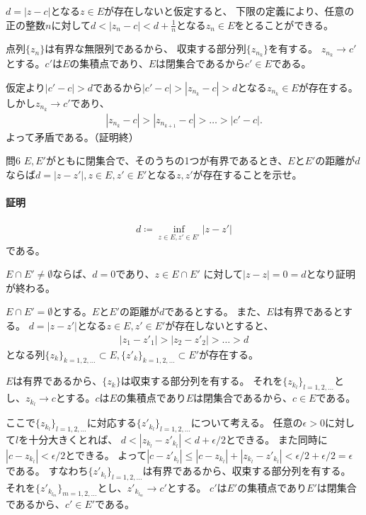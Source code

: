 $d=|z-c|$となる$z\in E$が存在しないと仮定すると、
下限の定義により、任意の正の整数$n$に対して$d<|z_n-c|<d+\frac{1}{n}$となる$z_n\in E$をとることができる。

点列$\{z_n\}$は有界な無限列であるから、
収束する部分列$\{z_{n_k}\}$を有する。
$z_{n_k}\longrightarrow c'$とする。$c'$は$E$の集積点であり、$E$は閉集合であるから$c'\in E$である。

仮定より$|c'-c|>d$であるから$|c'-c|>|z_{n_k}-c|>d$となる$z_{n_k}\in E$が存在する。しかし$z_{n_k}\longrightarrow c'$であり、
\begin{align*}
    |z_{n_k}-c|>|z_{n_{k+1}}-c|>\dots>|c'-c|.
\end{align*}
よって矛盾である。（証明終）

\begin{mysimplebox}{問6}
    $E, E'$がともに閉集合で、そのうちの1つが有界であるとき、$E$と$E'$の距離が$d$ならば$d=|z-z'|, z\in E, z'\in E'$となる$z, z'$が存在することを示せ。
\end{mysimplebox}
\paragraph{証明}
\begin{align*}
    d\coloneqq \inf_{z\in E, z'\in E'}|z-z'|
\end{align*}
である。

$E\cap E'\neq \emptyset$ならば、$d=0$であり、$z\in E\cap E'$
に対して$|z-z|=0=d$となり証明が終わる。

$E\cap E'=\emptyset$とする。$E$と$E'$の距離が$d$であるとする。
また、$E$は有界であるとする。
$d=|z-z'|$となる$z\in E, z'\in E'$が存在しないとすると、
\begin{align*}
    |z_1-z'_1|>|z_2-z'_2|>\dots>d
\end{align*}
となる列$\{z_k\}_{k=1,2,\dots}\subset E, \{z'_k\}_{k=1,2,\dots}\subset E'$が存在する。

$E$は有界であるから、$\{z_k\}$は収束する部分列を有する。
それを$\{z_{k_l}\}_{l=1,2,\dots}$とし、$z_{k_l}\longrightarrow c$とする。$c$は$E$の集積点であり$E$は閉集合であるから、$c\in E$である。

ここで$\{z_{k_l}\}_{l=1,2,\dots}$に対応する$\{z'_{k_l}\}_{l=1,2,\dots}$について考える。
任意の$\epsilon>0$に対して$l$を十分大きくとれば、
$d<|z_{k_l}-z'_{k_l}|<d+\epsilon/2$とできる。
また同時に$|c-z_{k_l}|<\epsilon/2$とできる。
よって$|c-z'_{k_l}|\le|c-z_{k_l}|+|z_{k_l}-z'_{k_l}|<\epsilon/2+\epsilon/2=\epsilon$である。
すなわち$\{z'_{k_l}\}_{l=1,2,\dots}$は有界であるから、収束する部分列を有する。
それを$\{z'_{k_{l_m}}\}_{m=1,2,\dots}$とし、$z'_{k_{l_m}}\rightarrow c'$とする。
$c'$は$E'$の集積点であり$E'$は閉集合であるから、$c'\in E'$である。

